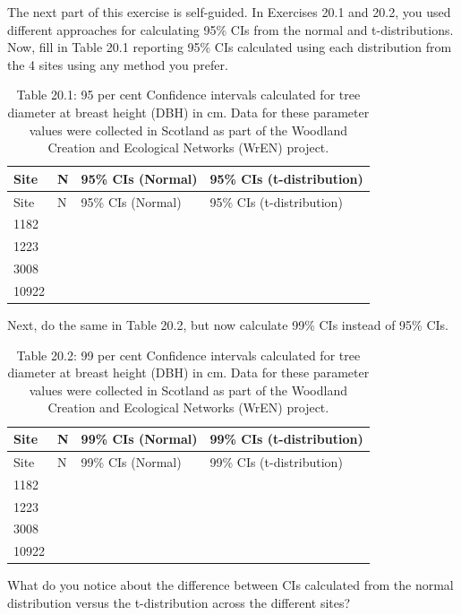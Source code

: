 \documentclass[
  openany]{scrbook}
\begin{document}
The next part of this exercise is self-guided.
In Exercises 20.1 and 20.2, you used different approaches for calculating 95\% CIs from the normal and t-distributions.
Now, fill in Table 20.1 reporting 95\% CIs calculated using each distribution from the 4 sites using any method you prefer.

\begin{longtable}[]{@{}llll@{}}
\caption{Table 20.1: 95 per cent Confidence intervals calculated for tree diameter at breast height (DBH) in cm. Data for these parameter values were collected in Scotland as part of the Woodland Creation and Ecological Networks (WrEN) project.}\tabularnewline
\toprule
Site & N & 95\% CIs (Normal) & 95\% CIs (t-distribution) \\
\midrule
\endfirsthead
\toprule
Site & N & 95\% CIs (Normal) & 95\% CIs (t-distribution) \\
\midrule
\endhead
1182 & & & \\
1223 & & & \\
3008 & & & \\
10922 & & & \\
\bottomrule
\end{longtable}

Next, do the same in Table 20.2, but now calculate 99\% CIs instead of 95\% CIs.

\begin{longtable}[]{@{}llll@{}}
\caption{Table 20.2: 99 per cent Confidence intervals calculated for tree diameter at breast height (DBH) in cm. Data for these parameter values were collected in Scotland as part of the Woodland Creation and Ecological Networks (WrEN) project.}\tabularnewline
\toprule
Site & N & 99\% CIs (Normal) & 99\% CIs (t-distribution) \\
\midrule
\endfirsthead
\toprule
Site & N & 99\% CIs (Normal) & 99\% CIs (t-distribution) \\
\midrule
\endhead
1182 & & & \\
1223 & & & \\
3008 & & & \\
10922 & & & \\
\bottomrule
\end{longtable}

What do you notice about the difference between CIs calculated from the normal distribution versus the t-distribution across the different sites?

\begin{verbatim}




\end{verbatim}
\end{document}

